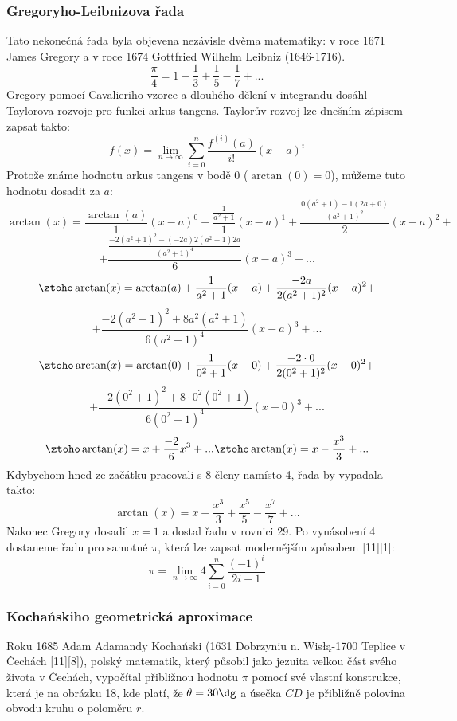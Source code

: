 \documentclass[soc]{gzwroc} %
\begin{document}
\subsubsection{Gregoryho-Leibnizova řada}
Tato nekonečná řada byla objevena nezávisle dvěma matematiky: v roce 1671 James Gregory a v roce 1674 Gottfried Wilhelm Leibniz (1646-1716).
\begin{equation}
\frac{\pi}{4}=1-\frac{1}{3}+\frac{1}{5}-\frac{1}{7}+...
\end{equation}
Gregory pomocí Cavalieriho vzorce a dlouhého dělení v integrandu dosáhl Taylorova rozvoje pro funkci arkus tangens. Taylorův rozvoj lze dnešním zápisem zapsat takto:
$$
f(x)=\lim_{n\to\infty} \sum_{i=0}^{n} \frac{f^{(i)}(a)}{i!}(x-a)^i
$$
Protože známe hodnotu arkus tangens v bodě 0 ($\arctan(0)=0$), můžeme tuto hodnotu dosadit za $a$:
$$
\arctan(x)=\frac{\arctan(a)}{1}(x-a)^0+\frac{\frac{1}{a^2+1}}{1}(x-a)^1+\frac{\frac{0(a^2+1)-1(2a+0)}{(a^2+1)^2}}{2}(x-a)^2+
$$
$$
+\frac{\frac{-2(a^2+1)^2-(-2a)2(a^2+1)2a}{(a^2+1)^4}}{6}(x-a)^3+...
$$
$$
\ztoho \arctan(x)=\arctan(a)+\frac{1}{a^2+1}(x-a)+\frac{-2a}{2(a^2+1)^2}(x-a)^2+
$$
$$
+\frac{-2(a^2+1)^2+8a^2(a^2+1)}{6(a^2+1)^4}(x-a)^3+...
$$
$$
\ztoho \arctan(x)=\arctan(0)+\frac{1}{0^2+1}(x-0)+\frac{-2\cdot0}{2(0^2+1)^2}(x-0)^2+
$$
$$
+\frac{-2(0^2+1)^2+8\cdot0^2(0^2+1)}{6(0^2+1)^4}(x-0)^3+...
$$
$$
\ztoho \arctan(x)=x+\frac{-2}{6}x^3+...\ztoho \arctan(x)=x-\frac{x^3}{3}+...
$$
Kdybychom hned ze začátku pracovali s 8 členy namísto 4, řada by vypadala takto:
$$
\arctan(x)=x-\frac{x^3}{3}+\frac{x^5}{5}-\frac{x^7}{7}+...
$$
Nakonec Gregory dosadil $x=1$ a dostal řadu v rovnici 29. Po vynásobení 4 dostaneme řadu pro samotné $\pi$, která lze zapsat modernějším způsobem [11][1]:
\begin{equation}
\pi=\lim_{n\to\infty} 4\sum_{i=0}^{n} \frac{(-1)^i}{2i+1}
\end{equation}
\subsubsection{Kochańskiho geometrická aproximace}
Roku 1685 Adam Adamandy Kochański (1631 Dobrzyniu n. Wisłą-1700 Teplice v Čechách [11][8]), polský matematik, který působil jako jezuita velkou část svého života v Čechách, vypočítal přibližnou hodnotu $\pi$ pomocí své vlastní konstrukce, která je na obrázku 18, kde platí, že $\theta =30\dg$ a úsečka $CD$ je přibližně polovina obvodu kruhu o poloměru $r$.
\end{document}
